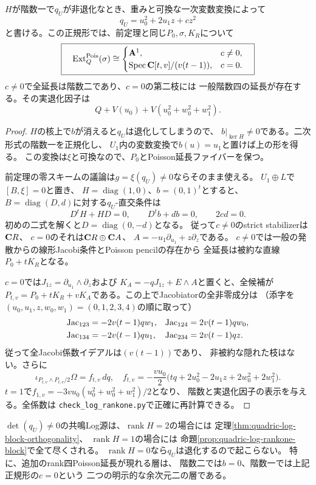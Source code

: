 \begin{proposition}[重み一ブロックが階数一の場合]
\label{prop:quadric-log-rankone-block}
$H$が階数一で$q_U$が非退化なとき、重みと可換な一次変数変換によって
\[
 q_U=u_0^2+2u_1z+cz^2
\]
と書ける。この正規形では、前定理と同じ$P_0,\sigma,K_R$について
\[
 \boxed{\quad\operatorname{Ext}^{\mathrm{Pois}}_Q(\sigma)\cong
 \begin{cases}
 \mathbf A^1,&c\ne0,\\
 \operatorname{Spec}\mathbf C[t,v]/(v(t-1)),&c=0.
 \end{cases}\quad}
\]
$c\ne0$で全延長は階数二であり、$c=0$の第二枝には
一般階数四の延長が存在する。その実退化因子は
\[
 Q+V(u_0)+V(u_0^2+w_0^2+w_1^2).
\]
\end{proposition}
\begin{proof}
$H$の核上で$b$が消えると$q_U$は退化してしまうので、
$b|_{\ker H}\ne0$である。二次形式の階数一を正規化し、
$U_1$内の変数変換で$b(u)=u_1$と置けば上の形を得る。
この変換は$\xi$と可換なので、$P_0$とPoisson延長ファイバーを保つ。

前定理の零スキームの議論は$g=\xi(q_U)\ne0$ならそのまま使える。
$U_1\oplus L$で$[B,\xi]=0$と置き、
$H=\operatorname{diag}(1,0)$、$b=(0,1)^t$とすると、
$B=\operatorname{diag}(D,d)$に対する$q_U$-直交条件は
\[
 D^tH+HD=0,\qquad D^tb+db=0,\qquad 2cd=0.
\]
初めの二式を解くと$D=\operatorname{diag}(0,-d)$となる。
従って$c\ne0$のstrict stabilizerは$\mathbf C R$、
$c=0$のそれは$\mathbf C R\oplus\mathbf C A$、
$A=-u_1\partial_{u_1}+z\partial_z$である。
$c\ne0$では一般の発散からの線形Jacobi条件とPoisson pencilの存在から
全延長は被約な直線$P_0+tK_R$となる。

$c=0$では$J_{1z}=\partial_{u_1}\wedge\partial_z$および
$K_A=-qJ_{1z}+E\wedge A$と置くと、全候補が
$P_{t,v}=P_0+tK_R+vK_A$である。この上でJacobiatorの全非零成分は
（添字を$(u_0,u_1,z,w_0,w_1)=(0,1,2,3,4)$の順に取って）
\[
\begin{aligned}
 \operatorname{Jac}_{123}&=-2v(t-1)q w_1,&
 \operatorname{Jac}_{124}&=2v(t-1)q w_0,\\
 \operatorname{Jac}_{134}&=-2v(t-1)q u_1,&
 \operatorname{Jac}_{234}&=2v(t-1)q z.
\end{aligned}
\]
従って全Jacobi係数イデアルは$(v(t-1))$であり、
非被約な隠れた枝はない。さらに
\[
 \iota_{P_{t,v}\wedge P_{t,v}/2}\Omega=f_{t,v}\,dq,
 \quad f_{t,v}=-\frac{vu_0}{2}
 \bigl(tq+2u_0^2-2u_1z+2w_0^2+2w_1^2\bigr).
\]
$t=1$で$f_{1,v}=-3vu_0(u_0^2+w_0^2+w_1^2)/2$となり、
階数と実退化因子の表示を与える。全係数は
\texttt{check\_log\_rankone.py}で正確に再計算できる。
\end{proof}

\begin{corollary}[非退化な共鳴Log二次形式の層別]
\label{cor:quadric-log-nondegenerate-stratification}
$\det(q_U)\ne0$の共鳴Log源は、$\operatorname{rank}H=2$の場合には
定理\ref{thm:quadric-log-block-orthogonality}、
$\operatorname{rank}H=1$の場合には
命題\ref{prop:quadric-log-rankone-block}で全て尽くされる。
$\operatorname{rank}H=0$なら$q_U$は退化するので起こらない。
特に、追加のrank四Poisson延長が現れる層は、
階数二では$b=0$、階数一では上記正規形の$c=0$という
二つの明示的な余次元二の層である。
\end{corollary}

